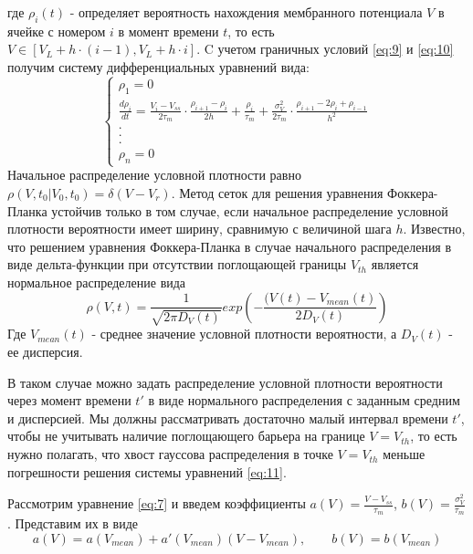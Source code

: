 где $\rho_i(t)$ - определяет вероятность нахождения мембранного потенциала $V$ в ячейке с номером $i$ в момент времени $t$, то есть $V\in[V_L+h\cdot(i-1),V_L+h\cdot i]$. C учетом граничных условий \eqref{eq:9} и \eqref{eq:10} получим систему дифференциальных уравнений вида:
\begin{equation}
\begin{cases}
\rho_1=0 \\
\displaystyle \frac{d\rho_{i}}{dt}=\frac{V_i-V_{ss}}{2\tau_m}\cdot\frac{\rho_{i+1}-\rho_{i}}{2h}+\frac{\rho_{i}}{\tau_m}+\frac{\sigma_V^2}{2\tau_m}\cdot\frac{\rho_{i+1}-2\rho_{i}+\rho_{i-1}}{h^2}\\
.\\
.\\
.\\
\rho_n=0
\end{cases}
\label{eq:12}
\end{equation}
Начальное распределение условной плотности равно $\rho(V, t_0|V_0, t_0)=\delta(V-V_r)$. Метод сеток для решения уравнения Фоккера-Планка устойчив только в том случае, если начальное распределение условной плотности вероятности имеет ширину, сравнимую с величиной шага $h$. Известно, что решением уравнения Фоккера-Планка в случае начального распределения в виде дельта-функции при отсутствии поглощающей границы $V_{th}$ является нормальное распределение вида
\begin{equation}
	\rho(V,t)=\frac{1}{\sqrt{2\pi D_V(t)}}exp\left(-\frac{(V(t)-V_{mean}(t)}{2D_V(t)}\right)
\label{eq:13}
\end{equation}
Где $V_{mean}(t)$ - среднее значение условной плотности вероятности, а $D_V(t)$ - ее дисперсия.

В таком случае можно задать распределение условной плотности вероятности через момент времени $t'$ в виде нормального распределения с заданным средним и дисперсией. Мы должны рассматривать достаточно малый интервал времени $t'$, чтобы не учитывать наличие поглощающего барьера на границе $V=V_{th}$, то есть нужно полагать, что хвост гауссова распределения в точке $V=V_{th}$ меньше погрешности решения системы уравнений \eqref{eq:11}.

Рассмотрим уравнение \eqref{eq:7} и введем коэффициенты $a(V)=\frac{V-V_{ss}}{\tau_m}$, $b(V)=\frac{\sigma_V^2}{\tau_m}$. Представим их в виде
\begin{equation}
a(V)=a(V_{mean})+a'(V_{mean})(V-V_{mean}), \qquad b(V)=b(V_{mean})
\label{eq:14}
\end{equation}

